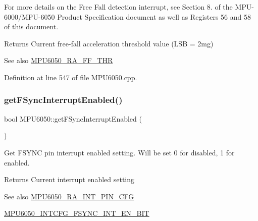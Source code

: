 For more details on the Free Fall detection interrupt, see Section 8. of the M\+P\+U-\/6000/\+M\+P\+U-\/6050 Product Specification document as well as Registers 56 and 58 of this document.

\begin{DoxyReturn}{Returns}
Current free-\/fall acceleration threshold value (L\+SB = 2mg) 
\end{DoxyReturn}
\begin{DoxySeeAlso}{See also}
\mbox{\hyperlink{MPU6050_8h_a391a4a95c33895c6926b9459cea5f3cd}{M\+P\+U6050\+\_\+\+R\+A\+\_\+\+F\+F\+\_\+\+T\+HR}} 
\end{DoxySeeAlso}


Definition at line 547 of file M\+P\+U6050.\+cpp.


\begin{DoxyCode}{0}

\end{DoxyCode}
\mbox{\label{classMPU6050_a4c01f9ab83b64dbbc6b62e658c3d3d9b}} 
\subsubsection{\texorpdfstring{getFSyncInterruptEnabled()}{getFSyncInterruptEnabled()}}
{\footnotesize\ttfamily bool M\+P\+U6050\+::get\+F\+Sync\+Interrupt\+Enabled (\begin{DoxyParamCaption}{ }\end{DoxyParamCaption})}

Get F\+S\+Y\+NC pin interrupt enabled setting. Will be set 0 for disabled, 1 for enabled. \begin{DoxyReturn}{Returns}
Current interrupt enabled setting 
\end{DoxyReturn}
\begin{DoxySeeAlso}{See also}
\mbox{\hyperlink{MPU6050_8h_a82344e1daef2bac2e0d938319528be6c}{M\+P\+U6050\+\_\+\+R\+A\+\_\+\+I\+N\+T\+\_\+\+P\+I\+N\+\_\+\+C\+FG}} 

\mbox{\hyperlink{MPU6050_8h_a39963ea6d8b9cbeebc4daf40f8872fed}{M\+P\+U6050\+\_\+\+I\+N\+T\+C\+F\+G\+\_\+\+F\+S\+Y\+N\+C\+\_\+\+I\+N\+T\+\_\+\+E\+N\+\_\+\+B\+IT}} 
\end{DoxySeeAlso}


